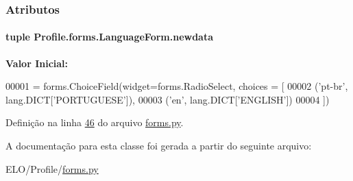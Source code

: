 \subsubsection{Atributos}
\hypertarget{classProfile_1_1forms_1_1LanguageForm_a327d764765fba9b8d9d82c86ca7e08a6}{
\paragraph[{newdata}]{\setlength{\rightskip}{0pt plus 5cm}tuple Profile.\-forms.\-Language\-Form.\-newdata\hspace{0.3cm}{\ttfamily [static]}}}\label{classProfile_1_1forms_1_1LanguageForm_a327d764765fba9b8d9d82c86ca7e08a6}
{\bfseries Valor Inicial\-:}
\begin{DoxyCode}
00001 = forms.ChoiceField(widget=forms.RadioSelect, choices = [
00002                                             (\textcolor{stringliteral}{'pt-br'}, lang.DICT[\textcolor{stringliteral}{'PORTUGUESE'}]),
00003                                             (\textcolor{stringliteral}{'en'}, lang.DICT[\textcolor{stringliteral}{'ENGLISH'}])
00004                                                 ])
\end{DoxyCode}


Definição na linha \hyperlink{Profile_2forms_8py_source_l00046}{46} do arquivo \hyperlink{Profile_2forms_8py_source}{forms.\-py}.



A documentação para esta classe foi gerada a partir do seguinte arquivo\-:\begin{DoxyCompactItemize}
\item 
E\-L\-O/\-Profile/\hyperlink{Profile_2forms_8py}{forms.\-py}\end{DoxyCompactItemize}
